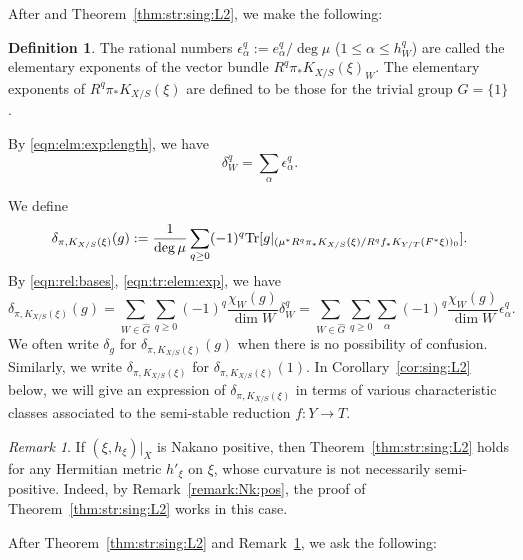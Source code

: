 \documentclass[amscd, leqno]{amsart}
\theoremstyle{plain}
\theoremstyle{definition}
\newtheorem{definition}[theorem]{Definition}
\theoremstyle{remark}
\newtheorem{remark}[theorem]{Remark}
\begin{document}
After \cite[Def.\,2.5]{EFM21} and Theorem~\ref{thm:str:sing:L2}, we make the following:


\begin{definition}
\label{def:elem:exponent}
The rational numbers $\epsilon^{q}_{\alpha} := e^{q}_{\alpha}/\deg \mu$ ($1\leq \alpha \leq h_{W}^{q}$) are called 
the elementary exponents of the vector bundle $R^{q}\pi_{*}K_{X/S}(\xi)_{W}$. 
The elementary exponents of $R^{q}\pi_{*}K_{X/S}(\xi)$ are defined to be those for the trivial group $G=\{1\}$.
\end{definition}


By \eqref{eqn:elm:exp:length}, we have
\begin{equation}
\label{eqn:tr:elem:exp}
\delta_{W}^{q} = \sum_{\alpha} \epsilon^{q}_{\alpha}.
\end{equation}


We define
\begin{equation}
\label{eqn:elem:exp}
\delta_{\pi, K_{X/S}(\xi)}(g) 
:= \frac{1}{\deg \mu} \sum_{q\geq0}(-1)^{q}{\rm Tr}[ g|_{(\mu^{*}R^{q}\pi_{*} K_{X/S}(\xi) / R^{q}f_{*} K_{Y/T}(F^{*}\xi))_{0}}].
\end{equation}
By \eqref{eqn:rel:bases}, \eqref{eqn:tr:elem:exp}, we have
\begin{equation}
\label{eqn:elem:exp}
\delta_{\pi, K_{X/S}(\xi)}(g) 
= 
\sum_{W \in \widehat{G}} \sum_{q\geq0} (-1)^{q}\frac{\chi_{W}(g)}{\dim W} \delta_{W}^{q}
=
\sum_{W \in \widehat{G}} \sum_{q\geq0} \sum_{\alpha} (-1)^{q}\frac{\chi_{W}(g)}{\dim W} \epsilon_{\alpha}^{q}.
\end{equation}
We often write $\delta_{g}$ for $\delta_{\pi, K_{X/S}(\xi)}(g)$ when there is no possibility of confusion.
Similarly, we write $\delta_{\pi, K_{X/S}(\xi)}$ for $\delta_{\pi, K_{X/S}(\xi)}(1)$. In Corollary~\ref{cor:sing:L2} below, 
we will give an expression of $\delta_{\pi, K_{X/S}(\xi)}$ in terms of various characteristic classes associated to 
the semi-stable reduction $f \colon Y \to T$.


\begin{remark}
\label{remark:str:sing:L2}
If $(\xi, h_{\xi})|_{X}$ is Nakano positive, then Theorem~\ref{thm:str:sing:L2} holds for any Hermitian metric $h'_{\xi}$ on $\xi$, 
whose curvature is not necessarily semi-positive. Indeed, by Remark~\ref{remark:Nk:pos}, 
the proof of Theorem~\ref{thm:str:sing:L2} works in this case. 
\end{remark}


After Theorem~\ref{thm:str:sing:L2} and Remark~\ref{remark:str:sing:L2}, we ask the following:
\end{document}
